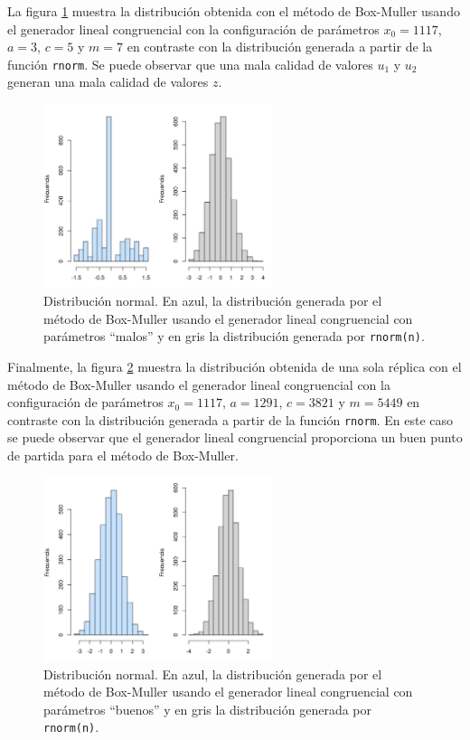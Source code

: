 \documentclass[12pt]{article}
\begin{document}
	La figura \ref{normal_malo} muestra la distribución obtenida con el método de Box-Muller usando el generador lineal congruencial con la configuración de parámetros $x_0 = 1117$, $a=3$, $c=5$ y $m=7$ en contraste con la distribución generada a partir de la función \texttt{rnorm}. Se puede observar que una mala calidad de valores $u_1$ y $u_2$ generan una mala calidad de valores $z$.
	
	\begin{figure}
		\centering
		\includegraphics[width=0.6\textwidth]{normal_uniforme_malo.png}
		\caption{Distribución normal. En azul, la distribución generada por el método de Box-Muller usando el generador lineal congruencial con parámetros ``malos'' y en gris la distribución generada por \texttt{rnorm(n)}.}
		\label{normal_malo}
	\end{figure}

	Finalmente, la figura \ref{normal_bueno} muestra la distribución obtenida de una sola réplica con el método de Box-Muller usando el generador lineal congruencial con la configuración de parámetros $x_0 = 1117$, $a= 1291$, $c=3821$ y $m=5449$ en contraste con la distribución generada a partir de la función \texttt{rnorm}. En este caso se puede observar que el generador lineal congruencial proporciona un buen punto de partida para el método de Box-Muller. 
	
	\begin{figure}
		\centering
		\includegraphics[width=0.6\textwidth]{normal_uniforme_regular.png}
		\caption{Distribución normal. En azul, la distribución generada por el método de Box-Muller usando el generador lineal congruencial con parámetros ``buenos'' y en gris la distribución generada por \texttt{rnorm(n)}.}
		\label{normal_bueno}
	\end{figure}
	
\end{document}
